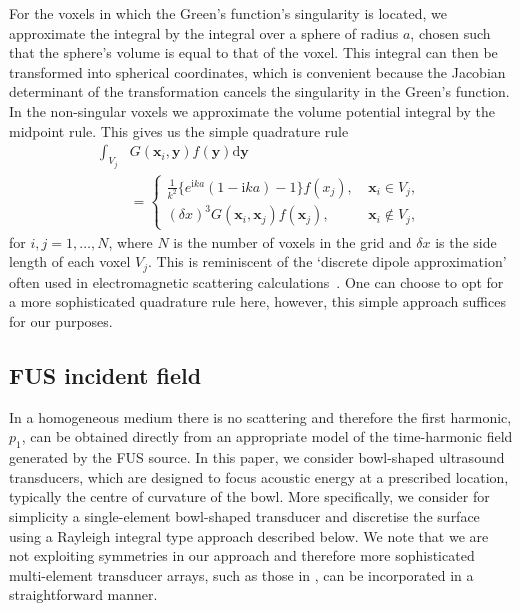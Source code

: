 \documentclass[preprint]{JASA}
\newcommand{\sd}{\mbox{d}}
\newcommand{\bx}{\mathbf{x}}
\newcommand{\by}{\mathbf{y}}
\newcommand{\red}[1]{{\color{red} #1}}
\begin{document}
For the voxels in which the Green's function's singularity is located, we 
approximate the integral by the integral over a sphere of radius $a$, chosen
such that the sphere's volume is equal to that of 
the voxel. \red{This integral can then be transformed into spherical coordinates, 
which is convenient because the Jacobian determinant of the transformation cancels
the singularity in the Green's function.}
In the non-singular voxels we 
approximate the volume potential integral by the midpoint rule. This gives us 
the simple quadrature rule
\begin{align}
    \nonumber\int_{V_j}&G(\bx_i,\by)f(\by)\sd \by \\ 
    &=\begin{cases}
        \frac{1}{k^2}\{e^{\text{i}ka}(1-\text{i}ka) - 1\}f(x_j), \ &\bx_i\in V_j, \\
        (\delta x)^3 G(\bx_i, \bx_j)f(\bx_j),\ &\bx_i\notin V_j,
    \end{cases}
    \label{eqn:quad}
\end{align}
for $i,j=1,\ldots,N$, where $N$ is the number of voxels in the grid and $\delta x$
is the side length of each voxel $V_j$.
This is reminiscent of the `discrete dipole approximation' often used in 
electromagnetic scattering calculations~\cite{draine1994discrete}.
One can choose to opt for a more sophisticated quadrature rule here, however, 
this simple approach suffices for our purposes.

\subsection{\red{FUS} incident field}
\label{subsec:incident}
In a homogeneous medium there is no scattering and therefore the first harmonic,
$p_1$, can be obtained directly from an appropriate model of the time-harmonic 
field generated by the \red{FUS} source. In this paper, we consider bowl-shaped
ultrasound transducers, which are designed to focus acoustic energy at a prescribed
location, typically the centre of curvature of the bowl. 
More specifically, we consider for simplicity a single-element bowl-shaped transducer
and discretise the surface using a Rayleigh integral type approach described below.
We note that we are not exploiting symmetries in 
our approach and therefore more sophisticated multi-element transducer arrays, 
such as those in \cite{gelat2011modelling,gavrilov2000theoretical,kreider2013characterization},
can be incorporated in a straightforward manner. 
\end{document}
